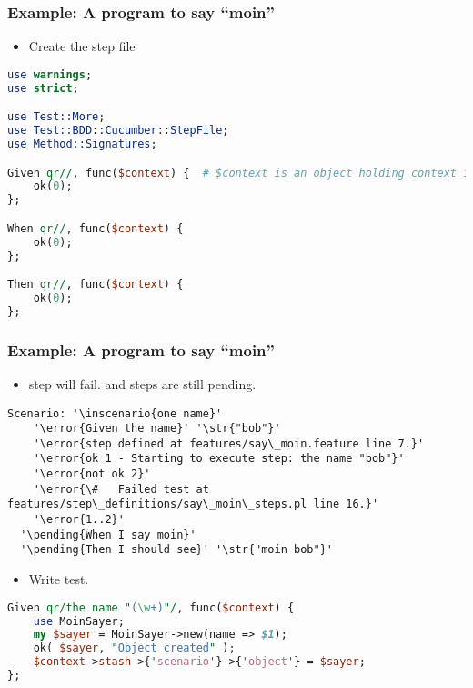 \documentclass[10pt]{vcs_beamer}
\newcommand{\pending}[1]{\color{DarkOrange}{#1}}
\newcommand{\inscenario}[1]{\color{RoyalBlue}{#1}}
\newcommand{\str}[1]{\color{Turquoise}{#1}}
\newcommand{\error}[1]{\color{red}{#1}}
\newcommand{\Given}{\color{DarkOrange}{Given}}
\newcommand{\When}{\color{RoyalBlue}{When}}
\newcommand{\Then}{\color{ForestGreen}{Then}}
\begin{document}
\begin{frame}[fragile]
\frametitle{Example: A program to say ``moin''}

\begin{itemize}
    \item Create the step file
\end{itemize}

\begin{lstlisting}[language=perl]
use warnings;
use strict;

use Test::More;
use Test::BDD::Cucumber::StepFile;
use Method::Signatures;

Given qr//, func($context) {  # $context is an object holding context info
    ok(0);
};

When qr//, func($context) {
    ok(0);
};

Then qr//, func($context) {
    ok(0);
};
\end{lstlisting}

\end{frame}

\begin{frame}[fragile]
\frametitle{Example: A program to say ``moin''}

\begin{itemize}
    \item \ttt{\Given} step will fail.  \ttt{\When} and \ttt{\Then} steps
        are still pending.
\end{itemize}

\begin{lstlisting}[escapeinside='']
Scenario: '\inscenario{one name}'
    '\error{Given the name}' '\str{"bob"}'
    '\error{step defined at features/say\_moin.feature line 7.}'
    '\error{ok 1 - Starting to execute step: the name "bob"}'
    '\error{not ok 2}'
    '\error{\#   Failed test at features/step\_definitions/say\_moin\_steps.pl line 16.}'
    '\error{1..2}'
  '\pending{When I say moin}'
  '\pending{Then I should see}' '\str{"moin bob"}'
\end{lstlisting}

\begin{itemize}
    \item Write \ttt{\Given} test.
\end{itemize}

\begin{lstlisting}[language=perl]
Given qr/the name "(\w+)"/, func($context) {
    use MoinSayer;
    my $sayer = MoinSayer->new(name => $1);
    ok( $sayer, "Object created" );
    $context->stash->{'scenario'}->{'object'} = $sayer;
};
\end{lstlisting}

\end{frame}
\end{document}
